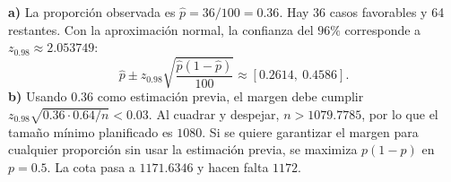 \textbf{a)} La proporción observada es $\hat p=36/100=0.36$.
Hay 36 casos favorables y 64 restantes. Con la aproximación normal,
la confianza del $96\%$ corresponde a $z_{0.98}\approx2.053749$:
\[
\hat p\pm z_{0.98}\sqrt{\frac{\hat p(1-\hat p)}{100}}
\approx\boxed{[0.2614,\ 0.4586]}.
\]
\textbf{b)} Usando $0.36$ como estimación previa, el margen
debe cumplir $z_{0.98}\sqrt{0.36\cdot0.64/n}<0.03$.
Al cuadrar y despejar, $n>1079.7785$, por lo que el tamaño
mínimo planificado es $\boxed{1080}$.
Si se quiere garantizar el margen para cualquier proporción
sin usar la estimación previa, se maximiza $p(1-p)$ en $p=0.5$.
La cota pasa a $1171.6346$ y hacen falta $\boxed{1172}$.
